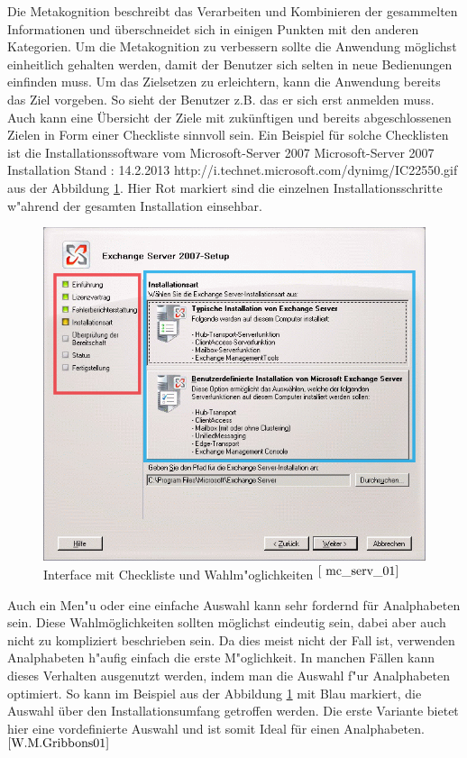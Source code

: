 Die Metakognition beschreibt das Verarbeiten und Kombinieren der gesammelten Informationen und überschneidet sich in einigen Punkten mit den anderen Kategorien. Um die Metakognition zu verbessern sollte die Anwendung möglichst einheitlich gehalten werden, damit der Benutzer sich selten in neue Bedienungen einfinden muss. Um das Zielsetzen zu erleichtern, kann die Anwendung bereits das Ziel vorgeben. So sieht der Benutzer z.B. das er sich erst anmelden muss. Auch kann eine Übersicht der Ziele mit zukünftigen und bereits abgeschlossenen Zielen in Form einer Checkliste sinnvoll sein. Ein Beispiel für solche Checklisten ist die Installationssoftware vom Microsoft-Server 2007
						{Microsoft-Server 2007 Installation}
						{Stand : 14.2.2013}
						{http://i.technet.microsoft.com/dynimg/IC22550.gif} 
aus der Abbildung \ref{fig:InstallBsp}. Hier Rot markiert sind die einzelnen Installationsschritte w"ahrend der gesamten Installation einsehbar.\\
\begin{figure}[h]
	\centering
		\includegraphics[width=1.00\textwidth]{Daten/ServerBeispiel.png}
	\caption{Interface mit Checkliste und Wahlm"oglichkeiten $^{\ref{ mc_serv_01}}$}
	\label{fig:InstallBsp}
\end{figure}
Auch ein Men"u oder eine einfache Auswahl kann sehr fordernd für Analphabeten sein. Diese Wahlmöglichkeiten sollten möglichst eindeutig sein, dabei aber auch nicht zu kompliziert beschrieben sein. Da dies meist nicht der Fall ist, verwenden Analphabeten h"aufig
einfach die erste M"oglichkeit. In manchen Fällen kann dieses Verhalten ausgenutzt werden, indem man die Auswahl f"ur Analphabeten optimiert. So kann im Beispiel aus der Abbildung \ref{fig:InstallBsp} mit Blau markiert, die Auswahl über den Installationsumfang getroffen werden. Die erste Variante bietet hier eine vordefinierte Auswahl und ist somit Ideal für einen Analphabeten.$^{\ref{W.M.Gribbons01}}$\\


